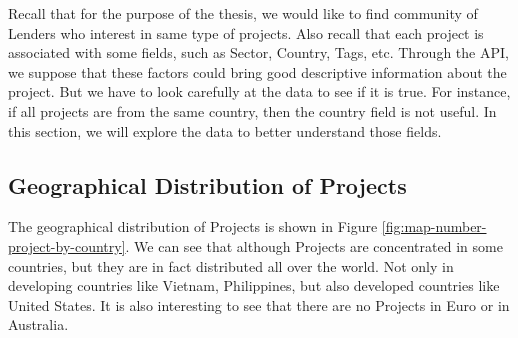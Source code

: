 Recall that for the purpose of the thesis, we would like to find community of Lenders who interest in same type of projects.
Also recall that each project is associated with some fields, such as Sector, Country, Tags, etc.
Through the API, we suppose that these factors could bring good descriptive information about the project.
But we have to look carefully at the data to see if it is true.
For instance, if all projects are from the same country, then the country field is not useful.
In this section, we will explore the data to better understand those fields.

\subsection{Geographical Distribution of Projects}

The geographical distribution of Projects is shown in Figure \ref{fig:map-number-project-by-country}.
We can see that although Projects are concentrated in some countries, but they are in fact distributed all over the world.
Not only in developing countries like Vietnam, Philippines,
but also developed countries like United States.
It is also interesting to see that there are no Projects in Euro or in Australia.


